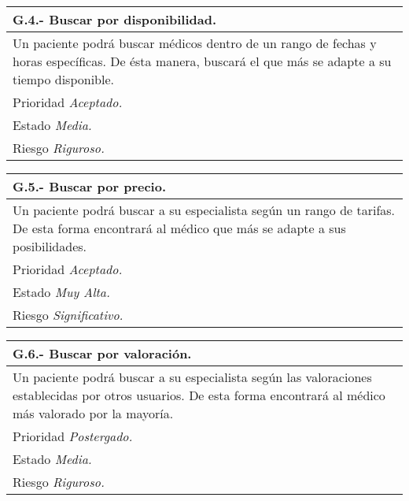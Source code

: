 	\begin{center}
	\begin{tabulary}{15cm}{|L|}
		\hline
			\bf{G.4.- Buscar por disponibilidad.} \\
		\hline
			Un paciente podrá buscar médicos dentro de un rango de fechas y horas específicas. De ésta manera, buscará el que más se adapte a su tiempo disponible. \\
		\hline
			Prioridad \textit{Aceptado.} \\
		\hline
			Estado \textit{Media.} \\
		\hline
			Riesgo \textit{Riguroso.} \\
		\hline
	\end{tabulary}
	\end{center}

	\begin{center}
	\begin{tabulary}{15cm}{|L|}
		\hline
			\bf{G.5.- Buscar por precio.} \\
		\hline
			Un paciente podrá buscar a su especialista según un rango de tarifas. De esta forma encontrará al médico que más se adapte a sus posibilidades. \\
		\hline
			Prioridad \textit{Aceptado.} \\
		\hline
			Estado \textit{Muy Alta.} \\
		\hline
			Riesgo \textit{Significativo.} \\
		\hline
	\end{tabulary}
	\end{center}

	\begin{center}
	\begin{tabulary}{15cm}{|L|}
		\hline
			\bf{G.6.- Buscar por valoración.} \\
		\hline
			Un paciente podrá buscar a su especialista según las valoraciones establecidas por otros usuarios. De esta forma encontrará al médico más valorado por la mayoría. \\
		\hline
			Prioridad \textit{Postergado.} \\
		\hline
			Estado \textit{Media.} \\
		\hline
			Riesgo \textit{Riguroso.} \\
		\hline
	\end{tabulary}
	\end{center}

